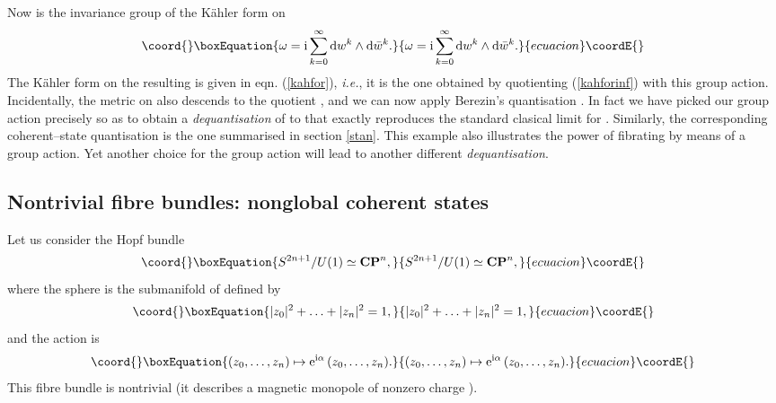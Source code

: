 \documentclass[a4paper,a4paper]{article}
\begin{document}
Now \coordHE{} is the invariance group of the K\"ahler form on \coordHE{}
\begin{equation}\coord{}\boxEquation{
\omega={\rm i}\sum_{k=0}^{\infty}{\rm d} w^k\wedge {\rm d}\bar w^k.
\label{kahforinf}
}{
\omega={\rm i}\sum_{k=0}^{\infty}{\rm d} w^k\wedge {\rm d}\bar w^k.
}{ecuacion}\coordE{}\end{equation}
The K\"ahler form on the resulting \coordHE{} is given in eqn. (\ref{kahfor}), 
{\it i.e.}, it is the one obtained by quotienting (\ref{kahforinf}) with this group action.
Incidentally, the metric \coordHE{} on \coordHE{} also descends to the quotient \coordHE{},
and we can now apply Berezin's quantisation \cite{BEREZIN}. In fact we have
picked our group action precisely so as to obtain a {\it dequantisation} 
of \coordHE{} to \coordHE{} that exactly reproduces the standard clasical limit 
\coordHE{} for \coordHE{}.  Similarly, the corresponding coherent--state quantisation
\cite{PERELOMOV} is the one summarised in section \ref{stan}. This example also 
illustrates the power of fibrating \coordHE{} by means of a group action. 
Yet another choice for the group action will lead to another different {\it dequantisation}.
       
\subsection{Nontrivial fibre bundles: nonglobal coherent states }\label{quatriexam}

Let us consider the Hopf bundle
\begin{equation}\coord{}\boxEquation{
S^{2n+1}/U(1)\simeq {\bf CP}^n,
\label{hopf}
}{
S^{2n+1}/U(1)\simeq {\bf CP}^n,
}{ecuacion}\coordE{}\end{equation}
where the sphere \coordHE{} is the submanifold of \coordHE{} defined by
\begin{equation}\coord{}\boxEquation{
|z_0|^2 + \ldots + |z_n|^2=1,
\label{sphere}
}{
|z_0|^2 + \ldots + |z_n|^2=1,
}{ecuacion}\coordE{}\end{equation}
and the \coordHE{} action is 
\begin{equation}\coord{}\boxEquation{
(z_0,\ldots, z_n)\mapsto {\rm e}^{{\rm i}\alpha}\,(z_0,\ldots, z_n).
\label{maphopf}
}{
(z_0,\ldots, z_n)\mapsto {\rm e}^{{\rm i}\alpha}\,(z_0,\ldots, z_n).
}{ecuacion}\coordE{}\end{equation}
This fibre bundle is nontrivial \cite{TOPPHYS} (it describes a magnetic monopole 
of nonzero charge \cite{QFTT}). 
\end{document}
